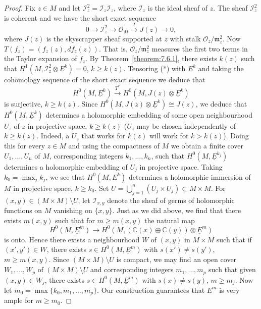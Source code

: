 \begin{proof}
Fix $z\in M$ and let $\mathcal{I}_z^2=\mathcal{I}_z\mathcal{I}_z$, where $\mathcal{I}_z$ is the ideal sheaf of $z$. The sheaf $\mathcal{I}_z^2$ is coherent and we have the short exact sequence
\[
0\to\mathcal{I}_z^2\to\mathcal{O}_M\xrightarrow{T}J(z)\to0,\tag{*}\label{eq:7:star:8}
\]
where $J(z)$ is the skyscrapper sheaf supported at $z$ with stalk $\mathcal{O}_z/\mathfrak{m}_z^2$. Now $T(f_z)=(f_z(z),df_z(z))$. That is, $\mathcal{O}_z/\mathfrak{m}_z^2$ measures the first two terms in the Taylor expansion of $f_z$. By Theorem~\ref{theorem:7.6.1}, there exists $k(z)$ such that $H^1(M,\mathcal{I}_z^2\otimes\underline{E}^k)=0$, $k\geq k(z)$. Tensoring (*) with $\underline{E}^k$ and taking the cohomology sequence of the short exact sequence we deduce that
\[
H^0(M,\underline{E}^k)\xrightarrow{T^*}H^0(M,J(z)\otimes\underline{E}^k)
\]
is surjective, $k\geq k(z)$. Since $H^0(M,J(z)\otimes\underline{E}^k)\cong J(z)$, we deduce that $H^0(M,\underline{E}^k)$ determines a holomorphic embedding of some open neighbourhood $U_z$ of $z$ in projective space, $k\geq k(z)$ ($U_z$ may be chosen independently of $k\geq k(z)$. Indeed, a $U_z$ that works for $k(z)$ will work for $k>k(z)$). Doing this for every $z\in M$ and using the compactness of $M$ we obtain a finite cover $U_1,\ldots,U_n$ of $M$, corresponding integers $k_1,\ldots,k_n$, such that $H^0(M,\underline{E}^{k_j})$ determines a holomorphic embedding of $U_j$ in projective space. Taking $k_0=\max_j k_j$, we see that $H^0(M,\underline{E}^k)$ determines a holomorphic immersion of $M$ in projective space, $k\geq k_0$. Set $U=\bigcup_{j=1}^n(U_j\times U_j)\subset M\times M$. For $(x,y)\in(M\times M)\setminus U$, let $\mathcal{I}_{x,y}$ denote the sheaf of germs of holomorphic functions on $M$ vanishing on $\{x,y\}$. Just as we did above, we find that there exists $m(x,y)$ such that for $m\geq m(x,y)$ the natural map
\[
H^0(M,\underline{E}^m)\longrightarrow H^0(M,(\mathbb{C}(x)\oplus\mathbb{C}(y))\otimes\underline{E}^m)
\]
is onto. Hence there exists a neighbourhood $W$ of $(x,y)$ in $M\times M$ such that if $(x',y')\in W$, there exists $s\in H^0(M,\underline{E}^m)$ with $s(x')\ne s(y')$, $m\geq m(x,y)$. Since $(M\times M)\setminus U$ is compact, we may find an open cover $W_1,\ldots,W_p$ of $(M\times M)\setminus U$ and corresponding integers $m_1,\ldots,m_p$ such that given $(x,y)\in W_j$, there exists $s\in H^0(M,\underline{E}^m)$ with $s(x)\ne s(y)$, $m\geq m_j$. Now let $m_0=\max\{k_0,m_1,\ldots,m_p\}$. Our construction guarantees that $E^m$ is very ample for $m\geq m_0$.
\end{proof}
